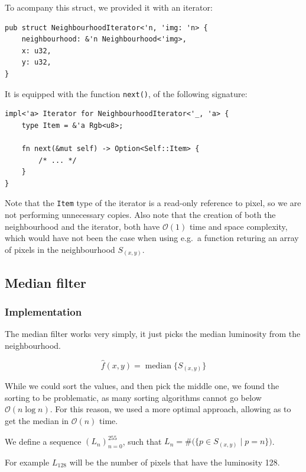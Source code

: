 \documentclass[12pt]{article}
\theoremstyle{definition}
\DeclareMathOperator*{\median}{median}
\begin{document}
To acompany this struct, we provided it with an iterator:

\begin{lstlisting}
pub struct NeighbourhoodIterator<'n, 'img: 'n> {
    neighbourhood: &'n Neighbourhood<'img>,
    x: u32,
    y: u32,
}
\end{lstlisting}

It is equipped with the function \lstinline{next()}, of the following signature:

\begin{lstlisting}
impl<'a> Iterator for NeighbourhoodIterator<'_, 'a> {
    type Item = &'a Rgb<u8>;

    fn next(&mut self) -> Option<Self::Item> {
        /* ... */
    }
}
\end{lstlisting}

Note that the \lstinline{Item} type of the iterator is a read-only reference to pixel, so we are not performing unnecessary copies.
Also note that the creation of both the neighbourhood and the iterator, both have $\mathcal{O}(1)$ time and space complexity,
which would have not been the case when using e.g.\ a function returing an array of pixels in the neighbourhood $S_{(x,y)}$.

\subsection{Median filter}

\subsubsection{Implementation}\label{sec:median-impl}

The median filter works very simply, it just picks the median luminosity from the neighbourhood.

\begin{equation}
    \hat{f}(x,y) = \median \big\{ S_{(x,y)} \big\}
\end{equation}

While we could sort the values, and then pick the middle one,
we found the sorting to be problematic, as many sorting algorithms cannot go below $\mathcal{O}(n \log n)$.
For this reason, we used a more optimal approach, allowing as to get the median in $\mathcal{O}(n)$ time.

We define a sequence $(L_n)_{n=0}^{255}$, such that $L_n = \#\big(\{p \in S_{(x,y)} \mid p = n\}\big)$.

For example $L_{128}$ will be the number of pixels that have the luminosity 128.
\end{document}
